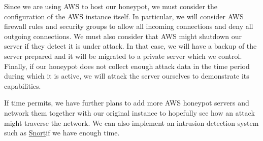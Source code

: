 Since we are using AWS to host our honeypot, we must consider the configuration of the AWS instance itself. In particular, we will consider AWS firewall rules and security groups to allow all incoming connections and deny all outgoing connections. We must also consider that AWS might shutdown our server if they detect it is under attack. In that case, we will have a backup of the server prepared and it will be migrated to a private server which we control. Finally, if our honeypot does not collect enough attack data in the time period during which it is active, we will attack the server ourselves to demonstrate its capabilities. 

If time permits, we have further plans to add more AWS honeypot servers and network them together with our original instance to hopefully see how an attack might traverse the network. We can also implement an intrusion detection system such as \href{https://www.snort.org/}{Snort}if we have enough time. 